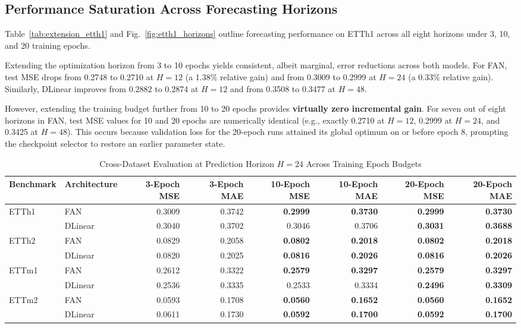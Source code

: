 \documentclass[journal]{IEEEtran}
\begin{document}
\subsection{Performance Saturation Across Forecasting Horizons}
Table~\ref{tab:extension_etth1} and Fig.~\ref{fig:etth1_horizons} outline forecasting performance on ETTh1 across all eight horizons under 3, 10, and 20 training epochs. 

Extending the optimization horizon from 3 to 10 epochs yields consistent, albeit marginal, error reductions across both models. For FAN, test MSE drops from 0.2748 to 0.2710 at $H=12$ (a 1.38\% relative gain) and from 0.3009 to 0.2999 at $H=24$ (a 0.33\% relative gain). Similarly, DLinear improves from 0.2882 to 0.2874 at $H=12$ and from 0.3508 to 0.3477 at $H=48$.

However, extending the training budget further from 10 to 20 epochs provides \textbf{virtually zero incremental gain}. For seven out of eight horizons in FAN, test MSE values for 10 and 20 epochs are numerically identical (e.g., exactly 0.2710 at $H=12$, 0.2999 at $H=24$, and 0.3425 at $H=48$). This occurs because validation loss for the 20-epoch runs attained its global optimum on or before epoch 8, prompting the checkpoint selector to restore an earlier parameter state.

\begin{table}[t]
\caption{Cross-Dataset Evaluation at Prediction Horizon $H=24$ Across Training Epoch Budgets}
\label{tab:extension_h24}
\centering
\footnotesize
\setlength{\tabcolsep}{7pt}
\begin{tabular}{@{}llrrrrrr@{}}
\toprule
Benchmark & Architecture & 3-Epoch MSE & 3-Epoch MAE & 10-Epoch MSE & 10-Epoch MAE & 20-Epoch MSE & 20-Epoch MAE\\
\midrule
ETTh1 & FAN & 0.3009 & 0.3742 & \textbf{0.2999} & \textbf{0.3730} & \textbf{0.2999} & \textbf{0.3730}\\
      & DLinear & 0.3040 & 0.3702 & 0.3046 & 0.3706 & \textbf{0.3031} & \textbf{0.3688}\\
\midrule
ETTh2 & FAN & 0.0829 & 0.2058 & \textbf{0.0802} & \textbf{0.2018} & \textbf{0.0802} & \textbf{0.2018}\\
      & DLinear & 0.0820 & 0.2025 & \textbf{0.0816} & \textbf{0.2026} & \textbf{0.0816} & \textbf{0.2026}\\
\midrule
ETTm1 & FAN & 0.2612 & 0.3322 & \textbf{0.2579} & \textbf{0.3297} & \textbf{0.2579} & \textbf{0.3297}\\
      & DLinear & 0.2536 & 0.3335 & 0.2533 & 0.3334 & \textbf{0.2496} & \textbf{0.3309}\\
\midrule
ETTm2 & FAN & 0.0593 & 0.1708 & \textbf{0.0560} & \textbf{0.1652} & \textbf{0.0560} & \textbf{0.1652}\\
      & DLinear & 0.0611 & 0.1730 & \textbf{0.0592} & \textbf{0.1700} & \textbf{0.0592} & \textbf{0.1700}\\
\bottomrule
\end{tabular}
\end{table}
\end{document}
